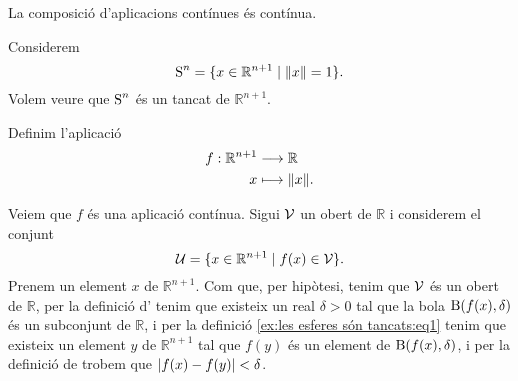 \documentclass[../../Main.tex]{subfiles}
\begin{document}
	\begin{observation}
		\label{obs:la composició d'aplicacions contínues és contínua}
		La composició d'aplicacions contínues és contínua.
	\end{observation}
	\begin{example}
		\label{ex:les esferes són tancats}
		Considerem
		\[
		    \esfera^{n}=\{x\in\mathbb{R}^{n+1}\mid\norm{x}=1\}.
		\]
		Volem veure que \(\operatorname{S}^{n}\) és un tancat de \(\mathbb{R}^{n+1}\).
		\begin{solution}
			Definim l'aplicació
			\begin{align*}
				f:\mathbb{R}^{n+1}&\longrightarrow\mathbb{R} \\
				x&\longmapsto\norm{x}.
			\end{align*}
			\begin{comment}
				Veiem que \(f\) és una aplicació tancada. Sigui \(\tancat{C}\) un tancat de \(\mathbb{R}^{n+1}\) i considerem el conjunt
				\[
				    \tancat{K}=\{f(x)\in\mathbb{R}\mid x\in\tancat{C}\}.
				\]
				Tenim que \(\tancat{K}\) és un tancat de \(\mathbb{R}\), ja que si \(y\) és un element de \(\tancat{K}\), aleshores \(y\neq f(x)\) per a tot \(x\) de \(\obert{C}\), i per tant existeix un real \(d>0\) tal que
				\[
				    d=\min_{x\in\tancat{C}}\abs{f(x)-y},
				\]
				i per tant tenim que per a tot \(y\) de \(\mathbb{R}\setminus\tancat{K}\) existeix una bola \(\bola(y,d)\) tal que \(\bola(y,d)\cap\tancat{K}=\emptyset\), i per la definició d'\myref{def:obert espai mètric} trobem que \(\mathbb{R}\setminus\tancat{K}\) és un obert de \(\mathbb{R}\). Aleshores per la definició de \myref{def:tancat} trobem que \(\tancat{K}\) és un tancat, i per la definició d'\myref{def:aplicació tancada} trobem que \(f\) és una aplicació tancada.
				
				Ara bé, tenim que \(\{1\}\) és un tancat de \(\mathbb{R}\)
			\end{comment}
			Veiem que \(f\) és una aplicació contínua. Sigui \(\mathcal{V}\) un obert de \(\mathbb{R}\) i considerem el conjunt
			\begin{equation}
				\label{ex:les esferes són tancats:eq1}
				\mathcal{U}=\{x\in\mathbb{R}^{n+1}\mid f(x)\in\mathcal{V}\}.
			\end{equation}
			Prenem un element \(x\) de \(\mathbb{R}^{n+1}\). Com que, per hipòtesi, tenim que \(\mathcal{V}\) és un obert de \(\mathbb{R}\), per la definició d' tenim que existeix un real \(\delta>0\) tal que la bola \(\operatorname{B}(f(x),\delta)\) és un subconjunt de \(\mathbb{R}\), i per la definició \eqref{ex:les esferes són tancats:eq1} tenim que existeix un element \(y\) de \(\mathbb{R}^{n+1}\) tal que \(f(y)\) és un element de \(\operatorname{B}(f(x),\delta)\), i per la definició de  trobem que \(\abs{f(x)-f(y)}<\delta\).
		\end{solution}
	\end{example}
\end{document}
